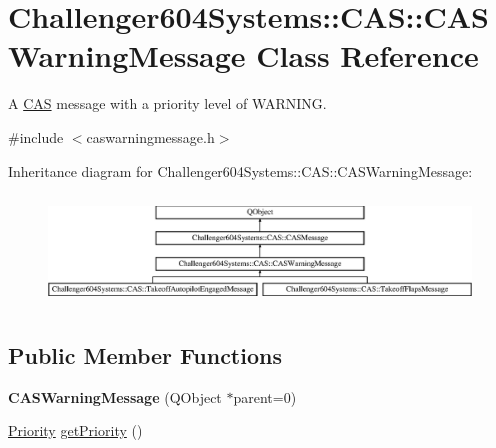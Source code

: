 \hypertarget{class_challenger604_systems_1_1_c_a_s_1_1_c_a_s_warning_message}{\section{Challenger604\-Systems\-:\-:C\-A\-S\-:\-:C\-A\-S\-Warning\-Message Class Reference}
\label{class_challenger604_systems_1_1_c_a_s_1_1_c_a_s_warning_message}
}


A \hyperlink{namespace_challenger604_systems_1_1_c_a_s}{C\-A\-S} message with a priority level of W\-A\-R\-N\-I\-N\-G.  




{\ttfamily \#include $<$caswarningmessage.\-h$>$}

Inheritance diagram for Challenger604\-Systems\-:\-:C\-A\-S\-:\-:C\-A\-S\-Warning\-Message\-:\begin{figure}[H]
\begin{center}
\leavevmode
\includegraphics[height=2.955145cm]{class_challenger604_systems_1_1_c_a_s_1_1_c_a_s_warning_message}
\end{center}
\end{figure}
\subsection*{Public Member Functions}
\begin{DoxyCompactItemize}
\item 
\hypertarget{class_challenger604_systems_1_1_c_a_s_1_1_c_a_s_warning_message_a9a07585519447691153a7984d0ad2461}{{\bfseries C\-A\-S\-Warning\-Message} (Q\-Object $\ast$parent=0)}\label{class_challenger604_systems_1_1_c_a_s_1_1_c_a_s_warning_message_a9a07585519447691153a7984d0ad2461}

\item 
\hyperlink{class_challenger604_systems_1_1_c_a_s_1_1_c_a_s_message_a5a503c8cb9618403fcd342dca9ba1ca9}{Priority} \hyperlink{class_challenger604_systems_1_1_c_a_s_1_1_c_a_s_warning_message_a895fe790e94e2bda52eb6d78ce1ef09d}{get\-Priority} ()
\end{DoxyCompactItemize}
